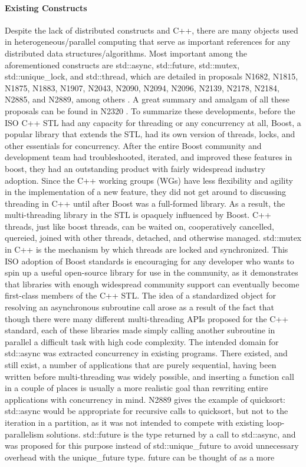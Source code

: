 \paragraph{Existing Constructs}
Despite the lack of distributed constructs and C++, there are many objects used in heterogeneous/parallel computing that serve as important references for any distributed data structures/algorithms. Most important among the aforementioned constructs are std::async, std::future, std::mutex, std::unique\_lock, and std::thread, which are detailed in proposals N1682, N1815, N1875, N1883, N1907, N2043, N2090, N2094,  N2096, N2139, N2178, N2184, N2885, and N2889, among others  \cite{n1682} \cite{n1815} \cite{n1875} \cite{n1883} \cite{n1907} \cite{n2043} \cite{n2096} \cite{n2139} \cite{n2178} \cite{n2184} \cite{n2285} \cite{n2889}. A great summary and amalgam of all these proposals can be found in N2320 \cite{n2320}. To summarize these developments, before the ISO C++ STL had any capacity for threading or any concurrency at all, Boost, a popular library that extends the STL, had its own version of threads, locks, and other essentials for concurrency. After the entire Boost community and development team had troubleshooted, iterated, and improved these features in boost, they had an outstanding product with fairly widespread industry adoption. Since the C++ working groups (WGs) have less flexibility and agility in the implementation of a new feature, they did not get around to discussing threading in C++ until after Boost was a full-formed library. As a result, the multi-threading library in the STL is opaquely influenced by Boost. C++ threads, just like boost threads, can be waited on, cooperatively cancelled, quereied, joined with other threads, detached, and otherwise managed. std::mutex in C++ is the mechanism by which threads are locked and synchronized. This ISO adoption of Boost standards is encouraging for any developer who wants to spin up a useful open-source library for use in the community, as it demonstrates that libraries with enough widespread community support can eventually become first-class members of the C++ STL. The idea of a standardized object for resolving an asynchronous subroutine call arose as a result of the fact that though there were many different multi-threading APIs proposed for the C++ standard, each of these libraries made simply calling another subroutine in parallel a difficult task with high code complexity. The intended domain for std::async was extracted concurrency in existing programs. There existed, and still exist, a number of applications that are purely sequential, having been written before multi-threading was widely possible, and inserting a function call in a couple of places is usually a more realistic goal than rewriting entire applications with concurrency in mind. N2889 gives the example of quicksort: std::async would be appropriate for recursive calls to quicksort, but not to the iteration in a partition, as it was not intended to compete with existing loop-parallelism solutions. std::future is the type returned by a call to std::async, and was proposed for this purpose instead of std::unique\_future to avoid unnecessary overhead with the unique\_future type. future can be thought of as a more 